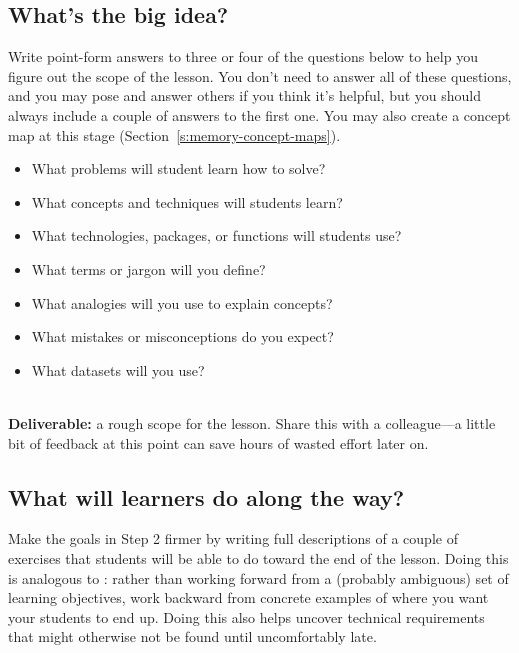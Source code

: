 \subsection*{What's the big idea?}

Write point-form answers to three or four of the questions below
to help you figure out the scope of the lesson.
You don't need to answer all of these questions,
and you may pose and answer others if you think it's helpful,
but you should always include a couple of answers to the first one.
You may also create a concept map at this stage (Section~\ref{s:memory-concept-maps}).

\begin{itemize}

\item
  What problems will student learn how to solve?

\item
  What concepts and techniques will students learn?

\item
  What technologies, packages, or functions will students use?

\item
  What terms or jargon will you define?

\item
  What analogies will you use to explain concepts?

\item
  What mistakes or misconceptions do you expect?

\item
  What datasets will you use?

\end{itemize}

~\\
\noindent
\textbf{Deliverable:}
a rough scope for the lesson.
Share this with a colleague---a little bit of feedback at this point
can save hours of wasted effort later on.

\subsection*{What will learners do along the way?}

Make the goals in Step 2 firmer by writing full descriptions of
a couple of exercises that students will be able to do toward the end of the lesson.
Doing this is analogous to :
rather than working forward from a (probably ambiguous) set of learning objectives,
work backward from concrete examples of where you want your students to end up.
Doing this also helps uncover technical requirements
that might otherwise not be found until uncomfortably late.

